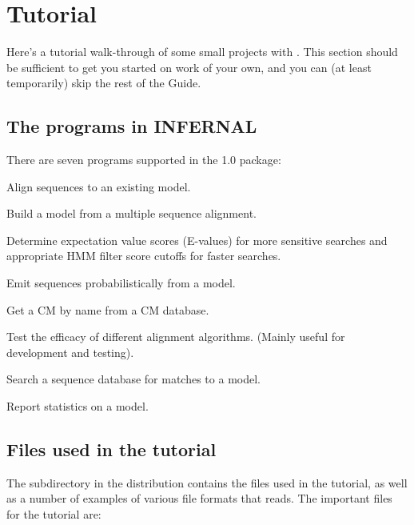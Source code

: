 \section{Tutorial}

Here's a tutorial walk-through of some small projects with
. This section should be sufficient to get 
you started on work of your own, and you can (at least temporarily)
skip the rest of the Guide.

\subsection {The programs in INFERNAL}

There are seven programs supported in the  1.0 package:

\begin{wideitem}
\item[\emprog{cmalign}] Align sequences to an existing model.
\item[\emprog{cmbuild}] Build a model from a multiple sequence alignment.
\item[\emprog{cmcalibrate}] Determine expectation value scores
  (E-values) for more sensitive searches and appropriate HMM filter
  score cutoffs for faster searches.
\item[\emprog{cmemit}] Emit sequences probabilistically from a model.
\item[\emprog{cmfetch}] Get a CM by name from a CM database.
\item[\emprog{cmscore}] Test the efficacy of different alignment
  algorithms. (Mainly useful for development and testing).
\item[\emprog{cmsearch}] Search a sequence database for matches to a model.
\item[\emprog{cmstat}] Report statistics on a model.
\end{wideitem}

\subsection{Files used in the tutorial}

The subdirectory  in the  distribution contains the
files used in the tutorial, as well as a number of examples of various
file formats that  reads. The important files for the tutorial
are:

